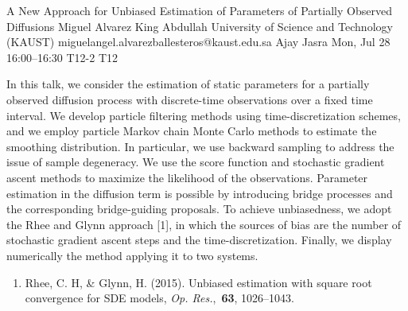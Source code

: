 \documentclass[12pt,lettersize,oneside]{book} %
\begin{document}
\begin{talk}
  {A New Approach for Unbiased Estimation of Parameters of Partially Observed Diffusions}%
  {Miguel Alvarez}%
  {King Abdullah University of Science and Technology (KAUST)}%
  {miguelangel.alvarezballesteros@kaust.edu.sa}%
  {Ajay Jasra}%
  {}%
  {Mon, Jul 28 16:00--16:30}%
  {T12-2}%
  {T12}%
  
    
   
In this talk, we consider the estimation of static parameters for a partially observed diffusion process with discrete-time observations over a fixed time interval. We develop particle filtering methods using time-discretization schemes, and we employ particle Markov chain Monte Carlo methods to estimate the smoothing distribution. In particular, we use backward sampling to address the issue of sample degeneracy. We use the score function and stochastic gradient ascent methods to maximize the likelihood of the observations. Parameter estimation in the diffusion term is possible by introducing bridge processes and the corresponding bridge-guiding proposals. To achieve unbiasedness, we adopt the Rhee and Glynn approach [1], in which the sources of bias are the number of stochastic gradient ascent steps and the time-discretization. Finally, we display numerically the method applying it to two systems. 

\medskip

\begin{enumerate}
 \item[{[1]}] Rhee, C. H, \& Glynn, H. (2015).  Unbiased estimation with square root convergence for SDE models, \emph{Op. Res.},~{\bf 63}, 1026--1043. 
\end{enumerate}

\end{talk}
\end{document}

